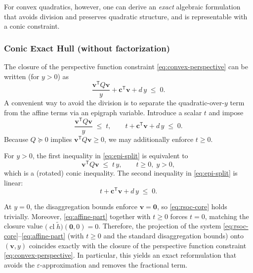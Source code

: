 \documentclass[11pt]{article}
\begin{document}
For convex quadratics, however, one can derive an \emph{exact} algebraic formulation that avoids division and preserves quadratic structure, and is representable with a conic constraint.




\subsubsection{ Conic Exact Hull (without factorization)}
The closure of the perspective function constraint \eqref{eq:convex-perspective} can be written (for $y>0$) as
\begin{equation}
\label{eq:persp-ypos}
    \frac{\mathbf v^{\mathsf T}Q\mathbf v}{y}
    + \mathbf c^{\mathsf T}\mathbf v
    + d\,y
    \;\le\; 0.
\end{equation}
A convenient way to avoid the division is to separate the quadratic-over-$y$ term from the affine terms
via an epigraph variable. Introduce a scalar $t$ and impose
\begin{equation}
\label{eq:epi-split}
    \frac{\mathbf v^{\mathsf T}Q\mathbf v}{y} \;\le\; t,
    \qquad
    t + \mathbf c^{\mathsf T}\mathbf v + d\,y \;\le\; 0.
\end{equation}
Because $Q\succeq 0$ implies $\mathbf v^{\mathsf T}Q\mathbf v \ge 0$, we may additionally enforce $t\ge 0$.

For $y>0$, the first inequality in \eqref{eq:epi-split} is equivalent to
\begin{equation}
\label{eq:rsoc-core}
    \mathbf v^{\mathsf T}Q\mathbf v \;\le\; t\,y,
    \qquad t\ge 0,\; y>0,
\end{equation}
which is a (rotated) conic inequality. The second inequality in \eqref{eq:epi-split} is linear:
\begin{equation}
\label{eq:affine-part}
    t + \mathbf c^{\mathsf T}\mathbf v + d\,y \;\le\; 0.
\end{equation}

At $y=0$, the disaggregation bounds enforce $\mathbf v=\mathbf 0$, so \eqref{eq:rsoc-core} holds trivially.
Moreover, \eqref{eq:affine-part} together with $t\ge 0$ forces $t=0$, matching the closure value
$\bigl(\operatorname{cl}\widetilde h\bigr)(\mathbf 0,0)=0$.
Therefore, the projection of the system
\eqref{eq:rsoc-core}--\eqref{eq:affine-part} (with $t\ge 0$ and the standard disaggregation bounds)
onto $(\mathbf v,y)$ coincides exactly with the closure of the perspective function constraint \eqref{eq:convex-perspective}.
In particular, this yields an exact reformulation that avoids the $\varepsilon$-approximation and removes the fractional term.
\end{document}
